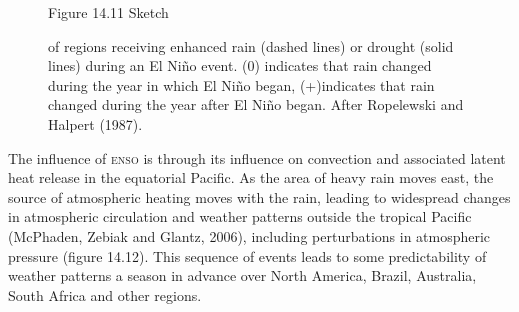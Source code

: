 \begin{figure}[t!]
\footnotesize
Figure 14.11 Sketch \rule{0pt}{4ex}of regions receiving enhanced rain
(dashed lines) or drought (solid lines) during an El Ni\~{n}o
event. (0) indicates that rain changed during the year in which El
Ni\~{n}o began, (+)indicates that rain changed during the year after
El Ni\~{n}o began. After Ropelewski and Halpert (1987).
\label{fig:teleconnections}
\vspace{-4ex}
\end{figure}

The influence of \textsc{enso} is through its influence on convection
and associated latent heat release in the equatorial Pacific. As the
area of heavy rain moves east, the source of atmospheric heating moves
with the rain, leading to widespread changes in atmospheric
circulation and weather patterns outside the tropical Pacific
(McPhaden, Zebiak and Glantz, 2006), including perturbations in
atmospheric pressure (figure 14.12). This sequence of events leads to
some predictability of weather patterns a season in advance over North
America, Brazil, Australia, South Africa and other regions.


